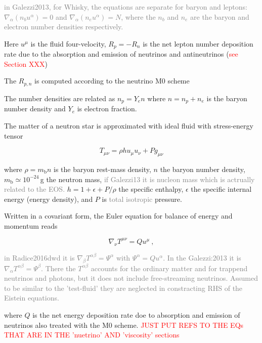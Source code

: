 \documentclass[11pt,a4paper,headinclude=true,DIV=14,BCOR=8mm,chapterprefix,listof=totoc,twoside,openright,abstracton]{scrbook}
\newcommand{\red}[1]{\textcolor{red}{#1}}
\newcommand{\gray}[1]{\textcolor{gray}{#1}}
\begin{document}
\gray{in Galezzi2013, for Whisky, the equations are separate for baryon and leptons: $\nabla_{\alpha}(n_bu^{\alpha})=0$ and $\nabla_{\alpha}(n_eu^{\alpha})=N$, where the $n_b$ and $n_e$ are the baryon and electron number densities respectively.}

Here $u^{\mu}$ is the fluid four-velocity, $R_p = -R_n$ is the net
lepton number deposition rate due to the absorption and emission of neutrinos 
and antineutrinos (\red{see Section XXX})

The $R_{p,n}$ is computed according to the neutrino M0 scheme \cite{Radice:2016dwd,Radice:2018pdn}

The number densities are related as $n_p=Y_e n$ where $n = n_p + n_e$ is the baryon 
number density and $Y_e$ is electron fraction.

The matter of a neutron star is approximated with ideal fluid with stress-energy tensor

\begin{equation}
T_{\mu\nu} = \rho h u_{\mu} u_{\nu} + Pg_{\mu\nu}
\end{equation}

where $\rho=m_{\text{b}} n$ is the baryon rest-mass density, 
$n$ the baryon number density, $m_{\text{b}} \simeq 10^{-24}\,$g 
the neutron mass, 
\gray{if Galezzi13 it is nucleon mass which is actrually related to the EOS.}
$h=1+\epsilon + P/\rho$ the specific enthalpy, 
$\epsilon$ the specific internal energy (energy density),
and $P$ is \gray{total isotropic} pressure.

Written in a covariant form, the Euler equation for balance of energy and momentum reads

\begin{equation}
\label{eq:wthc:euler}
\nabla_\nu T^{\mu\nu} = Q u^{\mu} \ ,
\end{equation}

\gray{in Radice2016dwd it is $\nabla_{\beta}T^{\alpha\beta}=\Psi^{\alpha}$
with $\Psi^{\alpha} = Q u^{\alpha}$.
}
\gray{In the Galezzi:2013 it is $\nabla_{\alpha}T^{\alpha\beta}=\Psi^{\beta}$.
There the $T^{\alpha\beta}$ accounts for the ordinary matter and for trappend neutrinos and photons, but it does not include free-streaming neutrinos. Assumed to be similar to the 'test-fluid' they are neglected in constracting RHS of the Eistein equations.
}

where $Q$ is the net energy deposition rate doe to absorption
and emission of neutrinos also treated with the M0 scheme.
\red{JUST PUT REFS TO THE EQs THAT ARE IN THE 'nuetrino' AND 'viscosity' sections}
\end{document}
